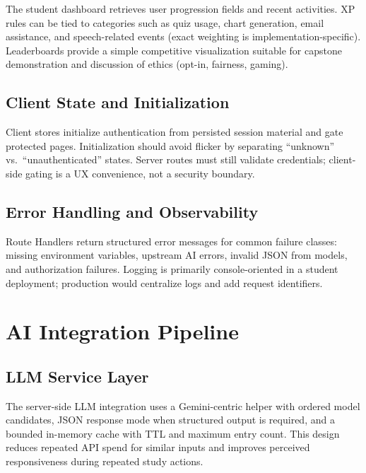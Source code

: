 \documentclass[conference]{IEEEtran}
\begin{document}
The student dashboard retrieves user progression fields and recent activities. XP rules can be tied to categories such as quiz usage, chart generation, email assistance, and speech-related events (exact weighting is implementation-specific). Leaderboards provide a simple competitive visualization suitable for capstone demonstration and discussion of ethics (opt-in, fairness, gaming).

\subsection{Client State and Initialization}

Client stores initialize authentication from persisted session material and gate protected pages. Initialization should avoid flicker by separating ``unknown'' vs.\ ``unauthenticated'' states. Server routes must still validate credentials; client-side gating is a UX convenience, not a security boundary.

\subsection{Error Handling and Observability}

Route Handlers return structured error messages for common failure classes: missing environment variables, upstream AI errors, invalid JSON from models, and authorization failures. Logging is primarily console-oriented in a student deployment; production would centralize logs and add request identifiers.

\section{AI Integration Pipeline}

\subsection{LLM Service Layer}

The server-side LLM integration uses a Gemini-centric helper with ordered model candidates, JSON response mode when structured output is required, and a bounded in-memory cache with TTL and maximum entry count. This design reduces repeated API spend for similar inputs and improves perceived responsiveness during repeated study actions.
\end{document}
